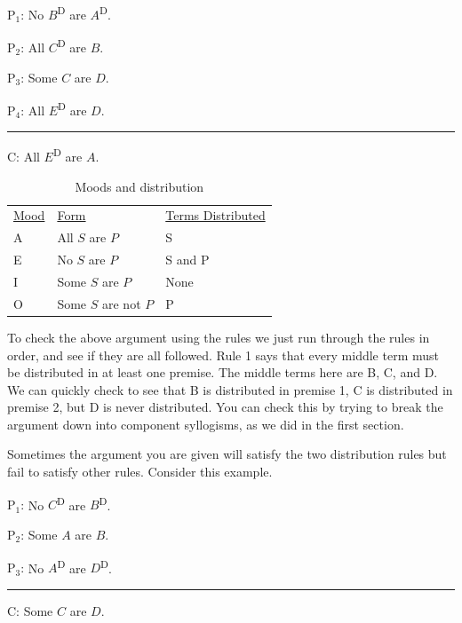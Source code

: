 {\begin{earg} 
\item[P$_1$:] No $B$\textsuperscript{D} are $A$\textsuperscript{D}.
\item[P$_2$:] All $C$\textsuperscript{D} are $B$. %
\item[P$_3$:] Some $C$ are $D$.  %
\item[P$_4$:] All $E$\textsuperscript{D} are $D$.
\vspace{-.5em} 
 \item [] \rule{0.2\linewidth}{.5pt} 
\item[C:] All $E$\textsuperscript{D} are $A$.  %
 \end{earg} 

\begin{table}
\begin{mdframed}[style=mytablehalfbox, userdefinedwidth=.6\textwidth]
\begin{tabu}{p{.1\linewidth}p{.4\linewidth}p{.5\linewidth}}
 \underline{Mood} & \underline{Form} & \underline{Terms Distributed} \\ 
A & All $S$ are $P$ & S\\
E & No $S$ are $P$ &  S and P\\
I & Some $S$ are $P$ & None\\
O &Some $S$ are not $P$ & P \\
\end{tabu}
\end{mdframed}
\caption{Moods and distribution}\label{tab:distribution_reminder}
\end{table}

To check the above argument using the rules we just run through the rules in order, and see if they are all followed. Rule 1 says that every middle term must be distributed in at least one premise. The middle terms here are B, C, and D. We can quickly check to see that B is distributed in premise 1, C is distributed in premise 2, but D is never distributed. You can check this by trying to break the argument down into component syllogisms, as we did in the first section.

Sometimes the argument you are given will satisfy the two distribution rules but fail to satisfy other rules. Consider this example.

\begin{earg} 
\item[P$_1$:] No $C$\textsuperscript{D} are $B$\textsuperscript{D}.
\item[P$_2$:] Some $A$ are $B$. %
\item[P$_3$:] No $A$\textsuperscript{D} are $D$\textsuperscript{D}. 
\vspace{-.5em} 
 \item [] \rule{0.2\linewidth}{.5pt} 
\item[C:] Some $C$ are $D$. %
 \end{earg} 

}
